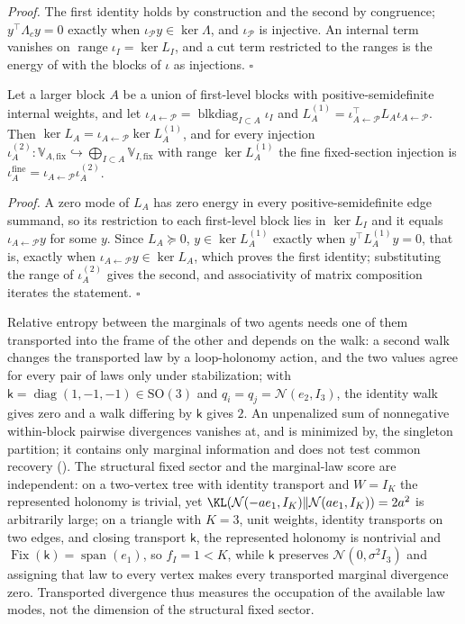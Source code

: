 \noindent\emph{Proof.}
The first identity holds by construction and the second by congruence; $y^\top\Lambda_cy=0$ exactly when
$\iota_{\mathcal P}y\in\ker\Lambda$, and $\iota_{\mathcal P}$ is injective. An internal term vanishes on
$\operatorname{range}\iota_I=\ker L_I$, and a cut term restricted to the ranges is the energy of
 with the blocks of $\iota$ as injections. $\square$

Let a larger block $A$ be a union of first-level blocks with positive-semidefinite internal weights, and
let $\iota_{A\leftarrow\mathcal P}=\operatorname{blkdiag}_{I\subset A}\iota_I$ and
$L^{(1)}_A=\iota_{A\leftarrow\mathcal P}^\top L_A\iota_{A\leftarrow\mathcal P}$. Then
$\ker L_A=\iota_{A\leftarrow\mathcal P}\ker L^{(1)}_A$, and for every injection
$\iota^{(2)}_A:\mathbb V_{A,\mathrm{fix}}\hookrightarrow\bigoplus_{I\subset A}\mathbb V_{I,\mathrm{fix}}$ with range $\ker L^{(1)}_A$ the fine
fixed-section injection is $\iota^{\mathrm{fine}}_A=\iota_{A\leftarrow\mathcal P}\iota^{(2)}_A$.

\noindent\emph{Proof.}
A zero mode of $L_A$ has zero energy in every positive-semidefinite edge summand, so its restriction to each
first-level block lies in $\ker L_I$ and it equals $\iota_{A\leftarrow\mathcal P}y$ for some $y$. Since
$L_A\succeq0$, $y\in\ker L^{(1)}_A$ exactly when $y^\top L^{(1)}_Ay=0$, that is, exactly when
$\iota_{A\leftarrow\mathcal P}y\in\ker L_A$, which proves the first identity; substituting the range of
$\iota^{(2)}_A$ gives the second, and associativity of matrix composition iterates the statement.
$\square$

Relative entropy between the marginals of two agents needs one of them transported into the frame of the
other and depends on the walk: a second walk changes the transported law by a loop-holonomy action, and
the two values agree for every pair of laws only under stabilization; with
$\mathsf k=\operatorname{diag}(1,-1,-1)\in\mathrm{SO}(3)$ and $q_i=q_j=\mathcal N(e_2,I_3)$, the identity walk
gives zero and a walk differing by $\mathsf k$ gives $2$. An unpenalized sum of nonnegative within-block
pairwise divergences vanishes at, and is minimized by, the singleton partition; it contains only marginal
information and does not test common recovery (). The structural fixed
sector and the marginal-law score are independent: on a two-vertex tree with identity transport and
$W=I_K$ the represented holonomy is trivial, yet $\KL(\mathcal N(-ae_1,I_K)\Vert\mathcal N(ae_1,I_K))=2a^2$ is
arbitrarily large; on a triangle with $K=3$, unit weights, identity transports on two edges, and closing
transport $\mathsf k$, the represented holonomy is nontrivial and
$\operatorname{Fix}(\mathsf k)=\operatorname{span}(e_1)$, so $f_I=1<K$, while $\mathsf k$ preserves
$\mathcal N(0,\sigma^2I_3)$ and assigning that law to every vertex makes every transported marginal
divergence zero. Transported divergence thus measures the occupation of the available law modes, not the
dimension of the structural fixed sector. 

